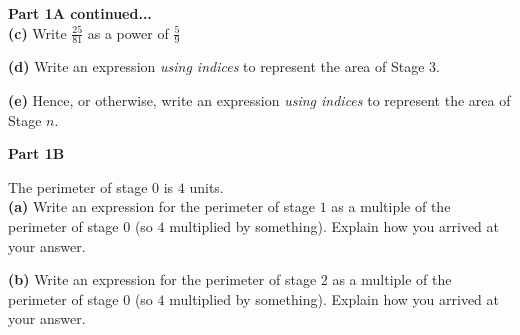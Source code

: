 \documentclass{article}
\begin{document}
{\pagebreak 
{\Large \textbf{Part 1A continued...} \\[6pt]

\textbf{(c)} Write {\huge $\frac{25}{81}$} as a power of {\huge $\frac{5}{9}$}

\vspace{0.1cm}
\begin{center}
\end{center}

\textbf{(d)} Write an expression \emph{using indices} to represent the area of Stage 3.

\vspace{0.1cm}
\begin{center}
\end{center}

\textbf{(e)} Hence, or otherwise, write an expression \emph{using indices} to represent the area of Stage $n$.

\vspace{0.1cm}
\begin{center}
\end{center}

\pagebreak
\textbf{Part 1B}

The perimeter of stage $0$ is $4$ units. \\[6pt]

\textbf{(a)} Write an expression for the perimeter of stage $1$ as a multiple of the perimeter of stage 0 (so $4$ multiplied by something).  Explain how you arrived at your answer.

\vspace{0.1cm}
\begin{center}
\end{center}

\textbf{(b)} Write an expression for the perimeter of stage $2$ as a multiple of the perimeter of stage 0 (so $4$ multiplied by something).  Explain how you arrived at your answer.

}}
\end{document}

